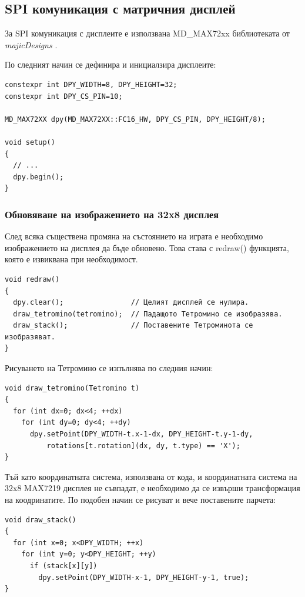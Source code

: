 \documentclass[titlepage, oneside, 14pt]{extbook}
\renewcommand{\texttt}[1]{{\small\ttfamily #1}}
\begin{document}
\subsection{SPI комуникация с матричния дисплей}

За SPI комуникация с дисплеите е използвана \texttt{MD_MAX72xx} библиотеката от \textit{majicDesigns} \cite{library}.

По следният начин се дефинира и инициалзира дисплеите:

\begin{verbatim}
constexpr int DPY_WIDTH=8, DPY_HEIGHT=32;
constexpr int DPY_CS_PIN=10;

MD_MAX72XX dpy(MD_MAX72XX::FC16_HW, DPY_CS_PIN, DPY_HEIGHT/8);

void setup()
{
  // ...
  dpy.begin();
}
\end{verbatim}

\subsubsection{Обновяване на изображението на 32x8 дисплея}

След всяка съществена промяна на състоянието на играта е необходимо изображението на дисплея да бъде обновено.
Това става с \texttt{redraw()} функцията, която е извиквана при необходимост.

\begin{verbatim}
void redraw()
{
  dpy.clear();                // Целият дисплей се нулира.
  draw_tetromino(tetromino);  // Падащото Тетромино се изобразява.
  draw_stack();               // Поставените Тетроминота се изобразяват.
}
\end{verbatim}

Рисуването на Тетромино се изпълнява по следния начин:

\begin{verbatim}
void draw_tetromino(Tetromino t)
{
  for (int dx=0; dx<4; ++dx)
    for (int dy=0; dy<4; ++dy)
      dpy.setPoint(DPY_WIDTH-t.x-1-dx, DPY_HEIGHT-t.y-1-dy,
          rotations[t.rotation](dx, dy, t.type) == 'X');
}
\end{verbatim}

Тъй като координатната система, използвана от кода, и координатната система на 32x8 MAX7219 дисплея не съвпадат,
е необходимо да се извърши трансформация на коодринатите. По подобен начин се рисуват и вече поставените парчета:

\begin{verbatim}
void draw_stack()
{
  for (int x=0; x<DPY_WIDTH; ++x)
    for (int y=0; y<DPY_HEIGHT; ++y)
      if (stack[x][y])
        dpy.setPoint(DPY_WIDTH-x-1, DPY_HEIGHT-y-1, true);
}
\end{verbatim}
\end{document}
